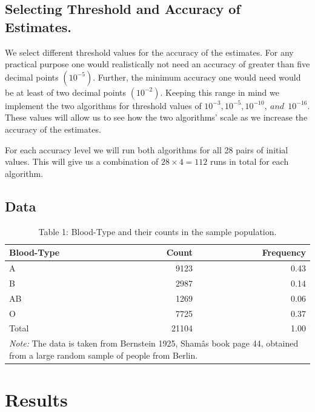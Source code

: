 \documentclass[]{article}
\begin{document}
\subsection{Selecting Threshold and Accuracy of
Estimates.}\label{selecting-threshold-and-accuracy-of-estimates.}

We select different threshold values for the accuracy of the estimates.
For any practical purpose one would realistically not need an accuracy
of greater than five decimal points \((10^{-5})\). Further, the minimum
accuracy one would need would be at least of two decimal points
\((10^{-2})\). Keeping this range in mind we implement the two
algorithms for threshold values of
\(10^{-3}, 10^{-5}, 10^{-10}, \: and \: \: 10^{-16}\). These values will
allow us to see how the two algorithms' scale as we increase the
accuracy of the estimates.

For each accuracy level we will run both algorithms for all 28 pairs of
initial values. This will give us a combination of \(28 \times 4 = 112\)
runs in total for each algorithm.

\subsection{Data}\label{data}

\begin{table}[t]

\caption{\label{tab:Data}Table 1: Blood-Type and their counts in the sample population.}
\centering
\begin{tabular}{l|r|r}
\hline
Blood-Type & Count & Frequency\\
\hline
A & 9123 & 0.43\\
\hline
B & 2987 & 0.14\\
\hline
AB & 1269 & 0.06\\
\hline
O & 7725 & 0.37\\
\hline
Total & 21104 & 1.00\\
\hline
\multicolumn{3}{l}{\rule{0pt}{1em}\textit{Note: } The data is taken from Bernstein 1925, Shamâs book page 44, obtained from a large random sample of people from Berlin.}\\
\end{tabular}
\end{table}

\section{Results}\label{results}
\end{document}

